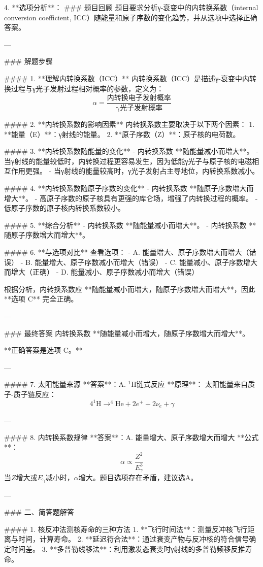 \documentclass{article}
\begin{document}
4. **选项分析**：  
### 题目回顾
题目要求分析γ-衰变中的内转换系数（internal conversion coefficient, ICC）随能量和原子序数的变化趋势，并从选项中选择正确答案。

---

### 解题步骤

#### 1. **理解内转换系数（ICC）**
内转换系数（ICC）是描述γ-衰变中内转换过程与γ光子发射过程相对概率的参数，定义为：
\[
\alpha = \frac{\text{内转换电子发射概率}}{\text{γ光子发射概率}}
\]

#### 2. **内转换系数的影响因素**
内转换系数主要取决于以下两个因素：
1. **能量（E）**：γ射线的能量。
2. **原子序数（Z）**：原子核的电荷数。

#### 3. **内转换系数随能量的变化**
- 内转换系数 **随能量减小而增大**。
  - 当γ射线的能量较低时，内转换过程更容易发生，因为低能γ光子与原子核的电磁相互作用更强。
  - 当γ射线的能量较高时，γ光子发射占主导地位，内转换系数减小。

#### 4. **内转换系数随原子序数的变化**
- 内转换系数 **随原子序数增大而增大**。
  - 高原子序数的原子核具有更强的库仑场，增强了内转换过程的概率。
  - 低原子序数的原子核内转换系数较小。

#### 5. **综合分析**
- 内转换系数 **随能量减小而增大**。
- 内转换系数 **随原子序数增大而增大**。

#### 6. **与选项对比**
查看选项：
- A. 能量增大、原子序数增大而增大（错误）
- B. 能量增大、原子序数减小而增大（错误）
- C. 能量减小、原子序数增大而增大（正确）
- D. 能量减小、原子序数减小而增大（错误）

根据分析，内转换系数应 **随能量减小而增大，随原子序数增大而增大**，因此 **选项 C** 完全正确。

---

### 最终答案
内转换系数 **随能量减小而增大，随原子序数增大而增大**。

**正确答案是选项 C。**

---

#### 7. 太阳能量来源  
**答案**：A. \( ^1\text{H} \)链式反应  
**原理**：  
太阳能量来自质子-质子链反应：  
\[
4 ^1\text{H} \to ^4\text{He} + 2e^+ + 2\nu_e + \gamma
\]

---

#### 8. 内转换系数规律  
**答案**：A. 能量增大、原子序数增大而增大  
**公式**：  
\[
\alpha \propto \frac{Z^2}{E_\gamma^3}  
\]  
当\( Z \)增大或\( E_\gamma \)减小时，\( \alpha \)增大。题目选项存在矛盾，建议选A。

---

### 二、简答题解答

#### 1. 核反冲法测核寿命的三种方法  
1. **飞行时间法**：测量反冲核飞行距离与时间，计算寿命。  
2. **延迟符合法**：通过衰变产物与反冲核的符合信号确定时间差。  
3. **多普勒线移法**：利用激发态衰变时γ射线的多普勒频移反推寿命。
\end{document}
